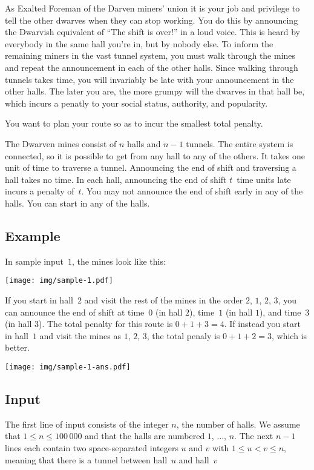 
As Exalted Foreman of the Darven miners' union it is your job and privilege to tell the other dwarves when they can stop working.
You do this by announcing the Dwarvish equivalent of “The shift is over!” in a loud voice.
This is heard by everybody in the same hall you're in, but by nobody else.
To inform the remaining miners in the vast tunnel system, you must walk through the mines and repeat the announcement in each of the other halls.
Since walking through tunnels takes time,
you will invariably be late with your announcement in the other halls.
The later you are, the more grumpy will the dwarves in that hall be, which incurs a penatly to your social status, authority, and popularity.

You want to plan your route so as to incur the smallest total penalty. 

\medskip
The Dwarven mines consist of $n$ halls and $n-1$ tunnels.
The entire system is connected, so it is possible to get from any hall to any of the others.
It takes one unit of time to traverse a tunnel.
Announcing the end of shift and traversing a hall takes no time.
In each hall, announcing the end of shift $t$~time units late incurs a penalty of~$t$.
You may not announce the end of shift early in any of the halls.
You can start in any of the halls.

\subsection*{Example}

In sample input~$1$, the mines look like this:

\texttt{[image: img/sample-1.pdf]}

If you start in hall~$2$ and visit the rest of the mines in the order $2$, $1$, $2$, $3$, you can announce the end of shift at time~$0$ (in hall $2$), time~$1$ (in hall $1$), and time~$3$ (in hall $3$).
The total penalty for this route is $0+1+3=4$.
If instead you start in hall~$1$ and visit the mines as $1$, $2$, $3$, the total penaly is $0+1+2=3$, which is better.

\texttt{[image: img/sample-1-ans.pdf]}

\subsection*{Input}

The first line of input consists of the integer $n$, the number of halls.
We assume that $1\leq n\leq 100\,000$ and that the halls are numbered $1$, $\ldots$, $n$.
The next $n-1$ lines each contain two space-separated integers $u$ and $v$ with $1\leq u < v \leq n$, meaning that there is a tunnel between hall~$u$ and hall~$v$ 


